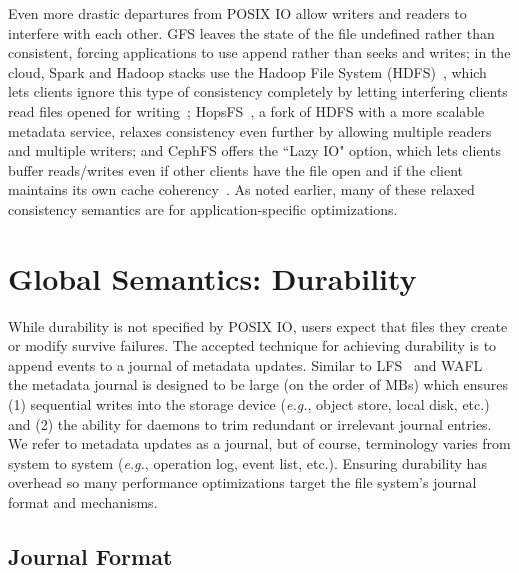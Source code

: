 Even more drastic departures from POSIX IO allow writers and readers to
interfere with each other. GFS leaves the state of the file undefined rather
than consistent, forcing applications to use append rather than seeks and
writes; in the cloud, Spark and Hadoop stacks use the Hadoop File System
(HDFS)~\cite{shvachko:msst10}, which lets clients ignore this type of
consistency completely by letting interfering clients read files opened for
writing~\cite{hakimzadeh:dais14-hdfs-consistency};
HopsFS~\cite{niaza:fast17-hopsfs}, a fork of HDFS with a more scalable metadata
service, relaxes consistency even further by allowing multiple readers and
multiple writers; and CephFS offers the ``Lazy IO" option, which lets clients
buffer reads/writes even if other clients have the file open and if the client
maintains its own cache coherency~\cite{docs:cephcaps}. As noted earlier, many
of these relaxed consistency semantics are for application-specific
optimizations.

\section{Global Semantics: Durability}

While durability is not specified by POSIX IO, users expect that files they
create or modify survive failures. The accepted technique for achieving
durability is to append events to a journal of metadata updates.  Similar to
LFS~\cite{rosenblum:acm1992-LFS} and WAFL~\cite{hitz:wtec1994-WAFL} the
metadata journal is designed to be large (on the order of MBs) which ensures
(1) sequential writes into the storage device ({\it e.g.}, object store, local
disk, etc.) and (2) the ability for daemons to trim redundant or irrelevant
journal entries. We refer to metadata updates as a journal, but of course,
terminology varies from system to system ({\it e.g.}, operation log, event
list, etc.). Ensuring durability has overhead so many performance optimizations
target the file system's journal format and mechanisms.

\subsection{Journal Format}

